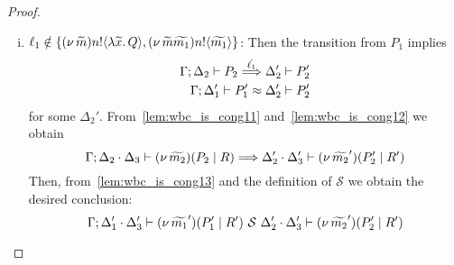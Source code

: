 \begin{proof}
\begin{enumerate}[I.]
\begin{enumerate}[1.]
\begin{enumerate}[i.]
				\item	$\ell_1 \notin \{(\nu\, \widetilde{m}) n ! \langle \lambda \widetilde{x}.\,Q \rangle, (\nu\, \widetilde{m}\widetilde{m_1}) n ! \langle \widetilde{m_1} \rangle\}$: Then the transition from $P_1$
						implies
						\begin{eqnarray}
							\Gamma; \Delta_2 \vdash P_2 \stackrel{\hat{\ell_1}}{\Longrightarrow} \Delta_2' \vdash P_2'
							\label{lem:wbc_is_cong12}\\
							\Gamma; \Delta_1' \vdash P_1' \approx \Delta_2' \vdash P_2'
							\label{lem:wbc_is_cong13}
						\end{eqnarray}
for some $\Delta_2'$. From~\eqref{lem:wbc_is_cong11} and~\eqref{lem:wbc_is_cong12} we obtain
						\[
							\Gamma; \Delta_2 \cdot \Delta_3 \vdash (\nu\, \widetilde{m_2})(P_2 \;|\; R) \stackrel{}{\Longrightarrow} \Delta_2' \cdot \Delta_3' \vdash (\nu\, \widetilde{m_2}')(P_2' \;|\; R')
						\]
						Then, from~\eqref{lem:wbc_is_cong13} and the definition of  $\mathcal{S}$  we obtain the desired conclusion:
						\[
							\Gamma; \Delta_1' \cdot \Delta_3' \vdash (\nu\, \widetilde{m_1}')(P_1' \;|\; R') \ \mathcal{S}\  \Delta_2' \cdot \Delta'_3 \vdash (\nu\, \widetilde{m_2}')(P_2' \;|\; R')
						\]


\end{enumerate}
\end{enumerate}
\end{enumerate}
\end{proof}
